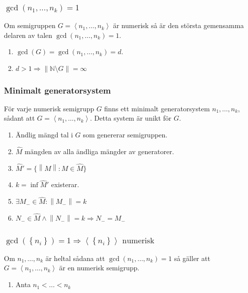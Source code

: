 \documentclass{beamer}
\begin{document}
\begin{frame}
	\frametitle{$\gcd(n_1, \ldots, n_k) = 1$}
\begin{Theorem}
	Om semigruppen $G = \left<n_1, \ldots, n_k\right>$ är numerisk så är den största gemensamma delaren av talen $\gcd(n_1, \ldots, n_k) = 1$.
\end{Theorem}

\begin{enumerate}
	\item<3-> $\gcd(G)=\gcd(n_1,\ldots,n_k)=d$.
	\item<4-> $d>1 \Longrightarrow \left\|\mathbb{N} \setminus G \right\| = \infty$
\end{enumerate}
\end{frame}

\begin{frame}
	\frametitle{Minimalt generatorsystem}
\begin{Theorem}
	För varje numerisk semigrupp $G$ finns ett minimalt generatorsystem $n_1, \ldots, n_k$, sådant att $G = \left<n_1, \ldots, n_k\right>$. Detta system är unikt för $G$.
\end{Theorem}

\begin{enumerate}
	\item<3-> Ändlig mängd tal i $G$ som genererar semigruppen.
	\item<4-> $\widehat{M}$ mängden av alla ändliga mängder av generatorer.
	\item<5-> $\widehat{M}' = \{ \left\|M\right\| : M \in \widehat{M}\}$
	\item<6-> $k = \inf \widehat{M}'$ existerar.
	\item<7-> $\exists M_- \in \widehat{M} : \left\|M_-\right\|=k$
	\item<8-> $N_- \in \widehat{M} \wedge \left\|N_-\right\|=k \Longrightarrow N_- = M_-$
\end{enumerate}\end{frame}

\begin{frame}
	\frametitle{$\gcd(\left\{n_i\right\})=1 \Longrightarrow \left<\left\{n_i\right\}\right> \text{ numerisk}$}
\begin{Theorem}
	\label{S4}
	Om $n_1, \ldots, n_k$ är heltal sådana att $\gcd(n_1, \ldots, n_k) = 1$ så gäller att $G = \left<n_1, \ldots, n_k\right>$ är en numerisk semigrupp.
\end{Theorem}

\begin{enumerate}
	\item<2->Anta $n_1 < \ldots < n_k$
\end{enumerate}
\end{frame}
\end{document}
